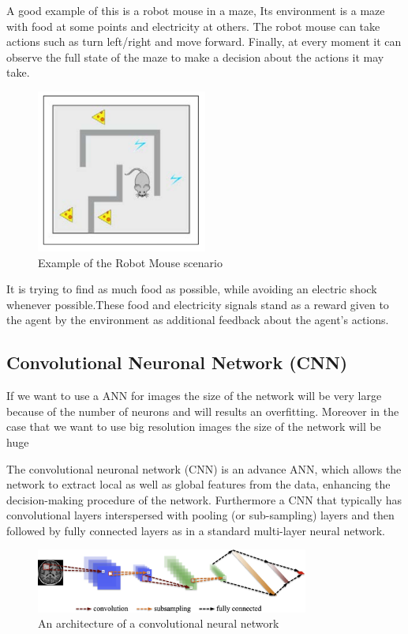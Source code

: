 A good example of this is a robot mouse in a maze, Its environment is a maze with food at some points and electricity at others. The robot
mouse can take actions such as turn left/right and move forward. Finally, at every moment it can observe the full state of the maze to make a 
decision about the actions it may take.
\begin{figure}[H]
\centering
\includegraphics[width=0.5\textwidth]{./figures/robotmouse-maze}
\caption{Example of the Robot Mouse scenario \cite{reinforcement-learning}}
\end{figure}
It is trying to find as much food as  possible, while avoiding an electric shock whenever possible.These food and electricity signals stand as a reward given to the agent by the environment as additional feedback about the agent's actions.


\subsection[Convolutional Neuronal Network (CNN)]{Convolutional Neuronal Network (CNN)}


If we want to use a ANN for images the size of the network will be very large because of the number of neurons and will results an overfitting. Moreover in the case that we want to use big resolution images the size of the network will be huge \cite{rajalingappaa}

The convolutional neuronal network (CNN) is an advance ANN, which allows the network to extract local as well as global features from the data, enhancing the decision-making procedure of the network\cite{abdullah}. Furthermore a CNN that typically has convolutional layers interspersed with pooling (or sub-sampling) layers and then followed by fully connected layers as in a standard multi-layer neural network.\cite{greenspan}

\begin{figure}[H]
\centering
\includegraphics[width=0.8\textwidth]{./figures/cnn}
\caption{An architecture of a convolutional neural network}
\end{figure}

